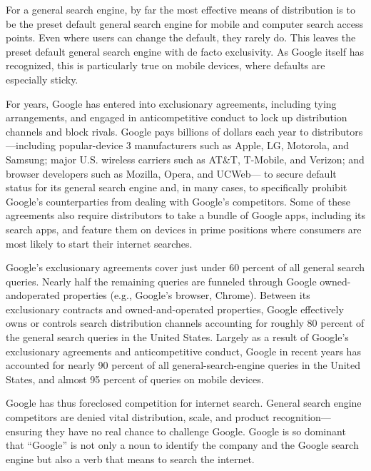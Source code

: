 \documentclass[11pt,b5paper]{scrartcl}
\begin{document}

For a general search engine, by far the most effective means of distribution is to
be the preset default general search engine for mobile and computer search access points. Even
where users can change the default, they rarely do. This leaves the preset default general search
engine with de facto exclusivity. As Google itself has recognized, this is particularly true on
mobile devices, where defaults are especially sticky.


For years, Google has entered into exclusionary agreements, including tying
arrangements, and engaged in anticompetitive conduct to lock up distribution channels and block
rivals. Google pays billions of dollars each year to distributors—including popular-device
3
manufacturers such as Apple, LG, Motorola, and Samsung; major U.S. wireless carriers such as
AT\&T, T-Mobile, and Verizon; and browser developers such as Mozilla, Opera, and UCWeb—
to secure default status for its general search engine and, in many cases, to specifically prohibit
Google’s counterparties from dealing with Google’s competitors. Some of these agreements also
require distributors to take a bundle of Google apps, including its search apps, and feature them
on devices in prime positions where consumers are most likely to start their internet searches.


Google’s exclusionary agreements cover just under 60 percent of all general
search queries. Nearly half the remaining queries are funneled through Google owned-andoperated properties (e.g., Google’s browser, Chrome). Between its exclusionary contracts and
owned-and-operated properties, Google effectively owns or controls search distribution channels
accounting for roughly 80 percent of the general search queries in the United States. Largely as a
result of Google’s exclusionary agreements and anticompetitive conduct, Google in recent years
has accounted for nearly 90 percent of all general-search-engine queries in the United States, and
almost 95 percent of queries on mobile devices.


Google has thus foreclosed competition for internet search. General search engine
competitors are denied vital distribution, scale, and product recognition—ensuring they have no
real chance to challenge Google. Google is so dominant that “Google” is not only a noun to
identify the company and the Google search engine but also a verb that means to search the
internet.
\end{document}
